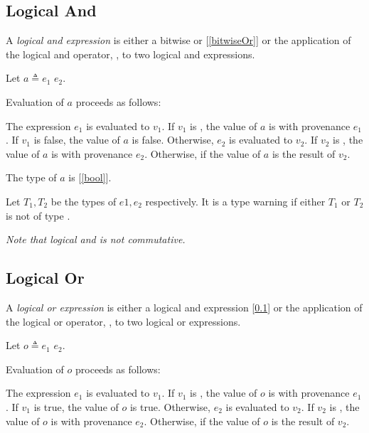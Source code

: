 \documentclass{article}
\begin{document}
{\subsection{\space Logical And}
\label{logicalAnd}

A {\em logical and expression} is either a bitwise or [\ref{bitwiseOr}] or the application of the logical and operator, \AND{}, to two logical and expressions.

\AndExpression{}

Let $a \triangleq e_1$ \AND{} $e_2$.

Evaluation of $a$ proceeds as follows:

The expression $e_1$ is evaluated to $v_1$.  If  $v_1$ is \NULL{}, the value of $a$ is \NULL{} with provenance $e_1$. If $v_1$ is false, the value of $a$ is false. Otherwise, $e_2$ is evaluated to $v_2$. If  $v_2$ is \NULL{}, the value of $a$ is \NULL{} with provenance $e_2$. Otherwise, if the value of $a$ is the result of $v_2$.

The type of $a$ is \BOOL{} [\ref{bool}].

Let $T_1, T_2$ be the types of $e1, e_2$ respectively.  It is a type warning if either $T_1$ or $T_2$ is not of type \BOOL{}.


{\em
Note that logical and is not commutative.
}

\subsection{\space Logical Or}
\label{logicalOr}

A {\em logical or expression} is either a logical and expression [\ref{logicalAnd}] or the application of the logical or operator, \OR{}, to two logical or expressions.

\OrExpression{}

Let $o \triangleq e_1$ \OR{} $e_2$.

Evaluation of $o$ proceeds as follows:

The expression $e_1$ is evaluated to $v_1$.  If  $v_1$ is \NULL{}, the value of $o$ is \NULL{} with provenance $e_1$. If $v_1$ is true, the value of $o$ is true. Otherwise, $e_2$ is evaluated to $v_2$. If $v_2$ is \NULL{}, the value of $o$ is \NULL{} with provenance $e_2$. Otherwise, if the value of $o$ is the result of $v_2$.

}
\end{document}
